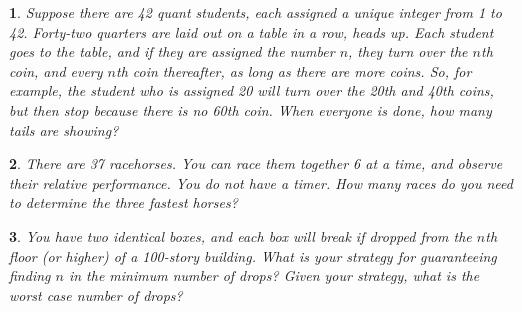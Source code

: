 \documentclass{report}
\newtheorem{problem}{}
\numberwithin{problem}{chapter} %
\begin{document}
\begin{problem}
Suppose there are 42 quant students, each assigned a unique integer from 1 to 42. Forty-two quarters are laid out on a table in a row, heads up. Each student goes to the table, and if they are assigned the number $n$, they turn over the $n$th coin, and every $n$th coin thereafter, as long as there are more coins. So, for example, the student who is assigned 20 will turn over the 20th and 40th coins, but then stop because there is no 60th coin. When everyone is done, how many tails are showing?
\end{problem}

\begin{problem}
There are 37 racehorses. You can race them together 6 at a time, and observe their relative performance. You do not have a timer. How many races do you need to determine the three fastest horses?
\end{problem}

\begin{problem}
You  have two identical boxes, and each box will break if dropped from the $n$th floor (or higher) of a 100-story building. What is your strategy for guaranteeing finding $n$ in the minimum number of drops? Given your strategy, what is the worst case number of drops?
\end{problem}

\printbibliography
\end{document}
